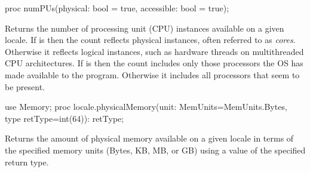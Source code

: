 \begin{protohead}
proc numPUs(physical: bool = true, accessible: bool = true);
\end{protohead}
\begin{protobody}
Returns the number of processing unit (CPU) instances
available on a given locale.
If  is 
then the count reflects physical instances,
often referred to as {\em cores}.
Otherwise it reflects logical instances,
such as hardware threads on multithreaded CPU architectures.
If  is 
then the count includes only those processors
the OS has made available to the program.
Otherwise it includes all processors that seem to be present.
\end{protobody}

\begin{protohead}
use Memory;
proc locale.physicalMemory(unit: MemUnits=MemUnits.Bytes, type retType=int(64)): retType;
\end{protohead}
\begin{protobody}
Returns the amount of physical memory available on a given locale in
terms of the specified memory units (Bytes, KB, MB, or GB) using a
value of the specified return type.
\end{protobody}




